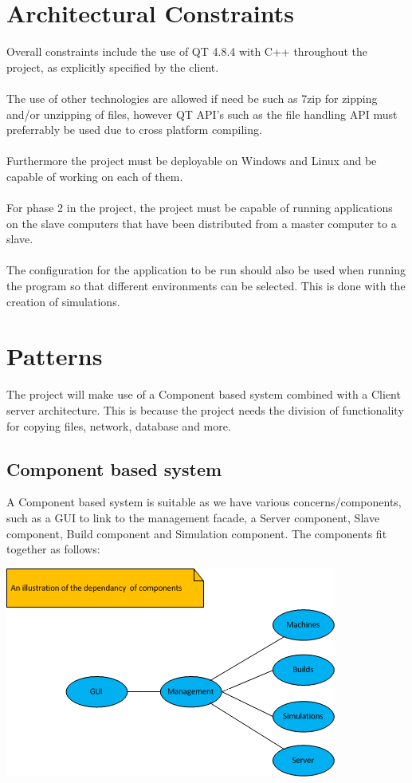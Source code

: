 \documentclass[a4paper,12pt,final]{article}
\begin{document}
\section{Architectural Constraints}
Overall constraints include the use of QT 4.8.4 with C++ throughout the project, as explicitly specified by the client.\\\textbf{\\}
The use of other technologies are allowed if need be such as 7zip for zipping and/or unzipping of files, however QT API's such as the file handling API must preferrably be used due to cross platform compiling.\\\textbf{\\}
Furthermore the project must be deployable on Windows and Linux and be capable of working on each of them.\\\textbf{\\}
For phase 2 in the project, the project must be capable of running applications on the slave computers that have been distributed from a master computer to a slave.\\\textbf{\\}
The configuration for the application to be run should also be used when running the program so that different environments can be selected. This is done with the creation of simulations.

\newpage
\section{Patterns}
The project will make use of a Component based system combined with a Client server architecture. This is because the project needs the division of functionality for copying files, network, database and more.
\subsection{Component based system}
A Component based system is suitable as we have various concerns/components, such as a GUI to link to the management facade, a Server component, Slave component, Build component and Simulation component. The components fit together as follows:\\
\begin{center}
  \includegraphics[scale=1]{ArchComponentDiag.png}
\end{center}
\newpage
\end{document}
